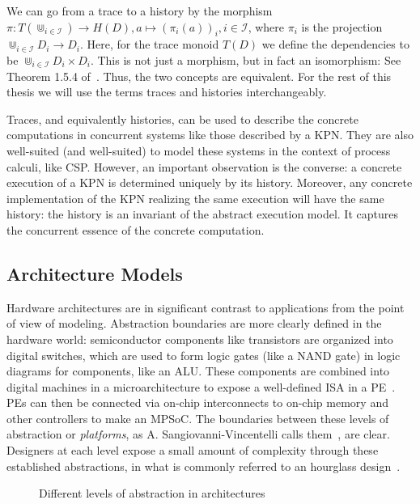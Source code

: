 We can go from a trace to a history by the morphism $\pi: T(\Cup_{i \in \mathcal{I}}) \rightarrow H(D), a \mapsto (\pi_i(a))_i, i \in \mathcal{I}$, where $\pi_i$ is the projection $\Cup_{i \in \mathcal{I}}D_i \rightarrow D_i$.
Here, for the trace monoid $T(D)$ we define the dependencies to be $\Cup_{i \in \mathcal{I}}D_i \times D_i$. 
This is not just a morphism, but in fact an isomorphism: See Theorem 1.5.4 of~\cite{mazurkiewicz1995introduction}.
Thus, the two concepts are equivalent.
For the rest of this thesis we will use the terms traces and histories interchangeably.


Traces, and equivalently histories, can be used to describe the concrete computations in concurrent systems like those described by a \ac{KPN}.
They are also well-suited (and well-suited) to model these systems in the context of process calculi, like \ac{CSP}.
However, an important observation is the converse: a concrete execution of a \ac{KPN} is determined uniquely by its history.
Moreover, any concrete implementation of the \ac{KPN} realizing the same execution will have the same history: the history is an invariant of the abstract execution model.
It captures the concurrent essence of the concrete computation.

\subsection{Architecture Models}
\label{sec:arch_models}
Hardware architectures are in significant contrast to applications from the point of view of modeling.
Abstraction boundaries are more clearly defined in the hardware world: semiconductor components like transistors are organized into digital switches, which are used to form logic gates (like a NAND gate) in logic diagrams for components, like an \ac{ALU}.
These components are combined into digital machines in a microarchitecture to expose a well-defined \acf{ISA} in a \ac{PE}~\cite{lee2017plato}.
\acp{PE} can then be connected via on-chip interconnects to on-chip memory and other controllers to make an \ac{MPSoC}.
The boundaries between these levels of abstraction or \emph{platforms}, as A. Sangiovanni-Vincentelli calls them~\cite{sangiovanni2007quo}, are clear.
Designers at each level expose a small amount of complexity through these established abstractions, in what is commonly referred to an hourglass design~\cite{10.1145/3274770}.

\begin{figure}[h]
	\centering
\resizebox{0.8\textwidth}{!}{
   \begin{tikzpicture}
     
   \end{tikzpicture}
 }
   \caption{Different levels of abstraction in architectures}
   \label{fig:architecture_abstractions}
\end{figure}

